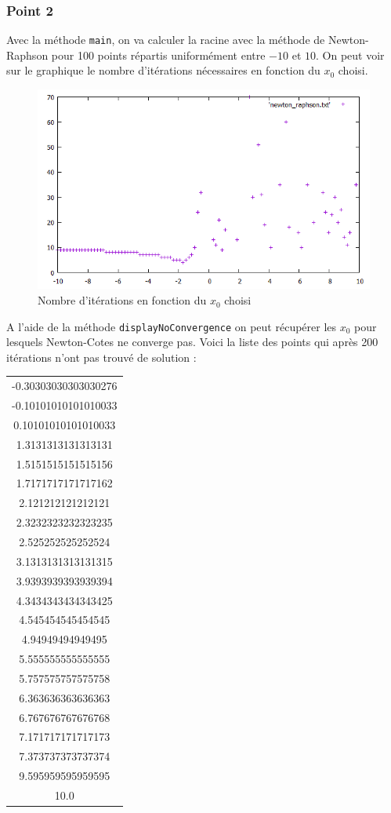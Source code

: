 \subsubsection{Point 2}

Avec la méthode \texttt{main}, on va calculer la racine avec la méthode de Newton-Raphson pour 100 points répartis uniformément entre $-10$ et $10$. On peut voir sur le graphique le nombre d'itérations nécessaires en fonction du $x_0$ choisi.

\begin{figure}[H]
	\caption{\label{11_newton_raphson} Nombre d'itérations en fonction du $x_0$ choisi}
	\centering
	\includegraphics[scale = 0.6]{11_newton_raphson.png}
\end{figure}

A l'aide de la méthode \texttt{displayNoConvergence} on peut récupérer les $x_0$ pour lesquels Newton-Cotes ne converge pas. Voici la liste des points qui après 200 itérations n'ont pas trouvé de solution :

\begin{table}[H]
\centering
\begin{tabular}{|c|}
\hline
-0.30303030303030276\\
-0.10101010101010033\\
0.10101010101010033\\
1.3131313131313131\\
1.5151515151515156\\
1.7171717171717162\\
2.121212121212121\\
2.3232323232323235\\
2.525252525252524\\
3.1313131313131315\\
3.9393939393939394\\
4.3434343434343425\\
4.545454545454545\\
4.94949494949495\\
5.555555555555555\\
5.757575757575758\\
6.363636363636363\\
6.767676767676768\\
7.171717171717173\\
7.373737373737374\\
9.595959595959595\\
10.0\\
\hline
\end{tabular}
\end{table}

